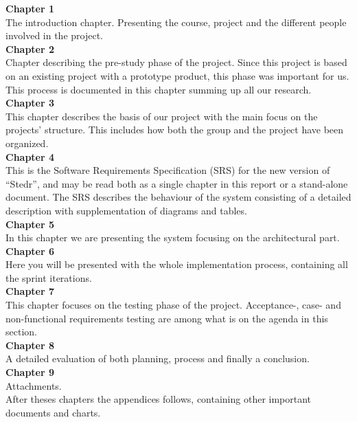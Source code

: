 \textbf{Chapter 1}\\
 The introduction chapter. Presenting the course, project and the different people involved in the project.\\[20pt]
\textbf{Chapter 2}\\
Chapter describing the pre-study phase of the project. Since this project is based on an existing project with a prototype product, this phase was important for us. This process is documented in this chapter summing up all our research. \\[20pt]
\textbf{Chapter 3}\\
This chapter describes the basis of our project with the main focus on the projects' structure. This includes how both the group and the project have been organized.\\[20pt]
\textbf{Chapter 4}\\
This is the Software Requirements Specification (SRS) for the new version of ``Stedr'', and may be read both as a single chapter in this report or a stand-alone document. The SRS describes the behaviour of the system consisting of a detailed description with supplementation of diagrams and tables.\\[20pt]
\textbf{Chapter 5}\\
In this chapter we are presenting the system focusing on the architectural part.\\[20pt]
\textbf{Chapter 6}\\
Here you will be presented with the whole implementation process, containing all the sprint iterations.\\[20pt]
\textbf{Chapter 7}\\
This chapter focuses on the testing phase of the project. Acceptance-, case- and non-functional requirements testing are among what is on the agenda in this section.\\[20pt]
\textbf{Chapter 8}\\
A detailed evaluation of both planning, process and finally a conclusion. \\[20pt]
\textbf{Chapter 9}\\
Attachments.\\[20pt]
After theses chapters the appendices follows, containing other important documents and charts.

